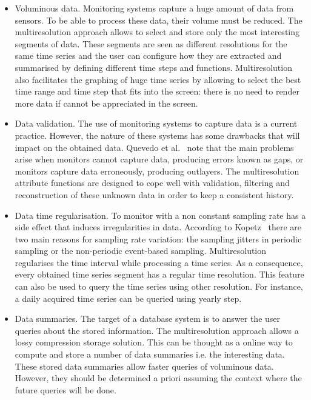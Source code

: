 \begin{itemize}
\item Voluminous data. Monitoring systems capture a huge amount of
  data from sensors. To be able to process these data, their volume must
  be reduced. The multiresolution approach allows to select and store
  only the most interesting segments of data. These segments are seen
  as different resolutions for the same time series and the user can
  configure how they are extracted and summarised by defining
  different time steps and functions. Multiresolution also facilitates
  the graphing of huge time series by allowing to select the best time
  range and time step that fits into the screen: there is no need to
  render more data if cannot be appreciated in the screen.

\item Data validation. The use of monitoring systems to capture data
  is a current practice. However, the nature of these systems has some
  drawbacks that will impact on the obtained data. Quevedo et
  al.~\cite{quevedo10} note that the main problems arise when monitors
  cannot capture data, producing errors known as gaps, or monitors
  capture data erroneously, producing outlayers.  The multiresolution
  attribute functions are designed to cope well with validation,
  filtering and reconstruction of these unknown data in order to keep
  a consistent history.

\item Data time regularisation. To monitor with a non constant
  sampling rate has a side effect that induces irregularities in data.
  According to Kopetz~\cite{kopetz11:realtime} there are two main
  reasons for sampling rate variation: the sampling jitters in
  periodic sampling or the non-periodic event-based sampling.
  Multiresolution regularises the time interval while processing a
  time series. As a consequence, every obtained time series segment
  has a regular time resolution. This feature can also be used to
  query the time series using other resolution. For instance, a daily
  acquired time series can be queried using yearly step.

\item Data summaries. The target of a database system is to answer the
  user queries about the stored information. The multiresolution
  approach allows a lossy compression storage solution. This can be
  thought as a online way to compute and store a number of data
  summaries i.e. the interesting data. These stored data summaries
  allow faster queries of voluminous data. However, they should be
  determined a priori assuming the context where the future queries
  will be done.
\end{itemize}


